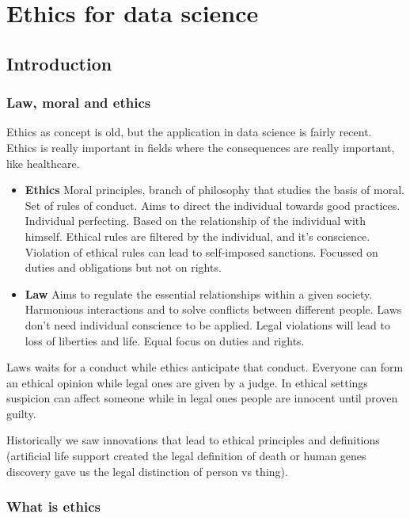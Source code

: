 \section{Ethics for data science}


\subsection{Introduction}

\subsubsection{Law, moral and ethics}

Ethics as concept is old, but the application in data science is fairly recent. Ethics is really important in fields where the consequences are really important, like healthcare. 

\begin{itemize}
    \item \textbf{Ethics} \ra Moral principles, branch of philosophy that studies the basis of moral. Set of rules of conduct. Aims to direct the individual towards good practices. Individual perfecting. Based on the relationship of the individual with himself. Ethical rules are filtered by the individual, and it's conscience. Violation of ethical rules can lead to self-imposed sanctions. Focussed on duties and obligations but not on rights.
    \item \textbf{Law} \ra Aims to regulate the essential relationships within a given society. Harmonious interactions and to solve conflicts between different people. Laws don't need individual conscience to be applied. Legal violations will lead to loss of liberties and life. Equal focus on duties and rights.
\end{itemize}

Laws waits for a conduct while ethics anticipate that conduct. Everyone can form an ethical opinion while legal ones are given by a judge. In ethical settings suspicion can affect someone while in legal ones people are innocent until proven guilty. 

\vspace{10pt}

Historically we saw innovations that lead to ethical principles and definitions (artificial life support created the legal definition of death or human genes discovery gave us the legal distinction of person vs thing).


\subsubsection{What is ethics}

